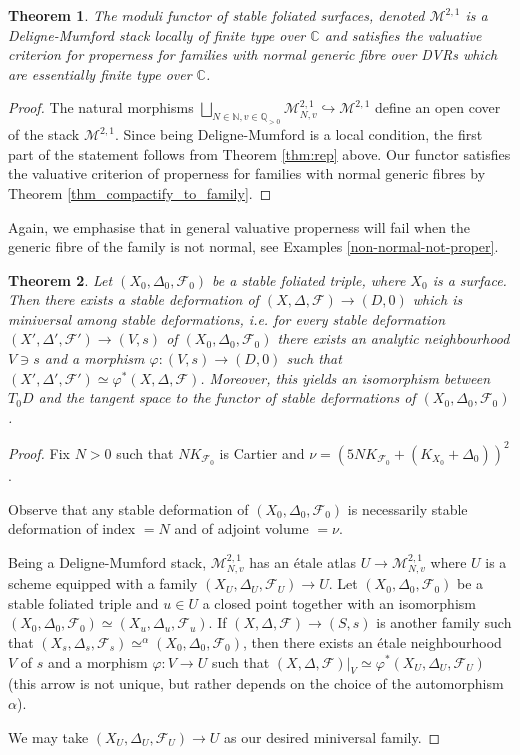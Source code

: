 \documentclass[12pt, a4paper]{amsart}
\newcommand\FF{\mathcal{F}}
\newcounter{Theorem}
\newtheorem{theorem}{Theorem}[section]
\theoremstyle{definition}
\theoremstyle{named}
\begin{document}
\begin{theorem}
\label{thm:rep2}
    The moduli functor of stable foliated surfaces, denoted $\mathcal M^{2, 1}$
    is a Deligne-Mumford stack locally of finite type over $\mathbb C$ and satisfies the valuative criterion for properness for families with normal generic fibre over DVRs which are essentially finite type over $\mathbb C$.
\end{theorem}
\begin{proof}
The natural morphisms $\bigsqcup_{N \in \mathbb N, v \in \mathbb Q_{>0}} \mathcal M^{2, 1}_{N, v} \hookrightarrow \mathcal M^{2, 1}$ define an open cover of the stack $\mathcal M^{2, 1}$. Since being Deligne-Mumford is a local condition, the first part of the statement follows from Theorem \ref{thm:rep} above. 
Our functor satisfies the valuative criterion of properness for families with normal generic fibres by Theorem \ref{thm_compactify_to_family}.
\end{proof}


Again, we emphasise that in general valuative properness will fail when the generic fibre of the family is not normal, see Examples \ref{non-normal-not-proper}.

\begin{theorem}
\label{thm_versalilty_stable_def}
    Let $(X_0,\Delta_0,\FF_0)$ be a stable foliated triple, where $X_0$ is a surface. Then there exists a  stable deformation of $(X,\Delta,\FF)\to (D,0)$ which is miniversal among stable deformations, i.e. for every stable deformation $(X',\Delta',\FF')\to (V,s)$ of $(X_0,\Delta_0,\FF_0)$ there exists an analytic neighbourhood $V\ni s$ and a morphism $\varphi: (V,s)\to (D,0)$ such that $(X',\Delta',\FF')\simeq \varphi^*(X,\Delta,\FF)$. Moreover, this yields an isomorphism between $T_0D$ and the tangent space to the functor of stable deformations of $(X_0,\Delta_0,\FF_0)$.
\end{theorem}
\begin{proof}
Fix $N>0$ such that $NK_{\mathcal F_0}$ is Cartier and $\nu = (5NK_{\mathcal F_0}+(K_{X_0}+\Delta_0))^2$.  

Observe that any stable deformation of $(X_0, \Delta_0, \mathcal F_0)$ is necessarily stable deformation of index $=N$ and of adjoint volume $=\nu$.


Being a Deligne-Mumford stack, $\mathcal M^{2, 1}_{N, v}$ has an \'etale atlas $U\to \mathcal M^{2, 1}_{N, v}$ where $U$ is a scheme equipped with a family $(X_U,\Delta_U,\FF_U)\to U$. 
Let $(X_0,\Delta_0,\FF_0)$ be a stable foliated triple and $u\in U$ a closed point together with an isomorphism $(X_0,\Delta_0,\FF_0)\simeq (X_u,\Delta_u,\FF_u)$. If $(X,\Delta,\FF)\to (S,s)$ is another family such that $(X_s,\Delta_s,\FF_s)\simeq^{\alpha} (X_0,\Delta_0,\FF_0) $, then there exists an \'etale neighbourhood $V$ of $s$ and a morphism $\varphi:V\to U$ such that $(X,\Delta,\FF)\vert_V\simeq \varphi^*(X_U,\Delta_U,\FF_U)$ (this arrow is not unique, but rather depends on the choice of the automorphism $\alpha$).

We may take $(X_U,\Delta_U,\FF_U)\to U$
as our desired miniversal family.
\end{proof}
\end{document}
